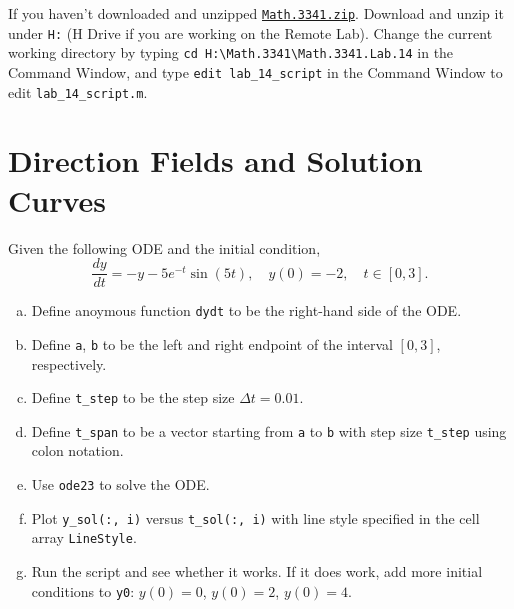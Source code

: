 If you haven't downloaded and unzipped \href{https://libaoj.in/courses/2021f/MATH3341/zip/Math.3341.zip}{\texttt{Math.3341.zip}}. Download and unzip it under \verb|H:| (H Drive if you are working on the Remote Lab). Change the current working directory by typing \verb|cd H:\Math.3341\Math.3341.Lab.14| in the Command Window, and type \verb|edit lab_14_script| in the Command Window to edit \verb|lab_14_script.m|.

\section{Direction Fields and Solution Curves}
Given the following ODE and the initial condition,
$$
\frac{dy}{dt} = -y - 5 e^{-t} \sin(5t), \quad y(0) = -2, \quad t \in [0, 3].
$$
\begin{enumerate}[(a)]
    \item Define anoymous function \verb`dydt` to be the right-hand side of the ODE.
    \item Define \verb`a`, \verb`b` to be the left and right endpoint of the interval $[0, 3]$, respectively.
    \item Define \verb`t_step` to be the step size $\Delta t = 0.01$.
    \item Define \verb`t_span` to be a vector starting from \verb`a` to \verb`b` with step size \verb`t_step` using colon notation.
    \item Use \verb`ode23` to solve the ODE.
    \item Plot \verb`y_sol(:, i)` versus \verb`t_sol(:, i)` with line style specified in the cell array \verb`LineStyle`.
    \item Run the script and see whether it works. If it does work, add more initial conditions to \verb|y0|: $y(0) = 0$, $y(0) = 2$, $y(0) = 4$.
\end{enumerate}
